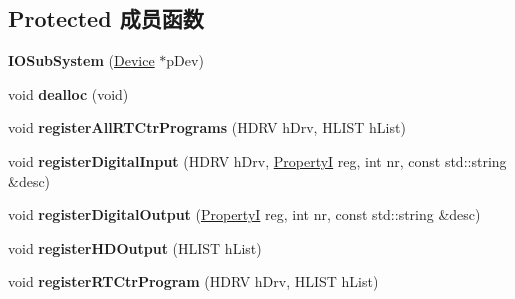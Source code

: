 \subsection*{Protected 成员函数}
\begin{DoxyCompactItemize}
\item 
\hypertarget{classmv_i_m_p_a_c_t_1_1acquire_1_1_i_o_sub_system_a5b11d134aa10c1e02d8e5cd57cd3cf91}{{\bfseries I\+O\+Sub\+System} (\hyperlink{classmv_i_m_p_a_c_t_1_1acquire_1_1_device}{Device} $\ast$p\+Dev)}\label{classmv_i_m_p_a_c_t_1_1acquire_1_1_i_o_sub_system_a5b11d134aa10c1e02d8e5cd57cd3cf91}

\item 
\hypertarget{classmv_i_m_p_a_c_t_1_1acquire_1_1_i_o_sub_system_af919596b5e34619bb71e0e09a4be8796}{void {\bfseries dealloc} (void)}\label{classmv_i_m_p_a_c_t_1_1acquire_1_1_i_o_sub_system_af919596b5e34619bb71e0e09a4be8796}

\item 
\hypertarget{classmv_i_m_p_a_c_t_1_1acquire_1_1_i_o_sub_system_a56ccb1aeb48f6d28b8276a3e0b8ddbd7}{void {\bfseries register\+All\+R\+T\+Ctr\+Programs} (H\+D\+R\+V h\+Drv, H\+L\+I\+S\+T h\+List)}\label{classmv_i_m_p_a_c_t_1_1acquire_1_1_i_o_sub_system_a56ccb1aeb48f6d28b8276a3e0b8ddbd7}

\item 
\hypertarget{classmv_i_m_p_a_c_t_1_1acquire_1_1_i_o_sub_system_a46b170c2210c1a4eef0fd8d68dce6722}{void {\bfseries register\+Digital\+Input} (H\+D\+R\+V h\+Drv, \hyperlink{group___common_interface_ga12d5e434238ca242a1ba4c6c3ea45780}{Property\+I} reg, int nr, const std\+::string \&desc)}\label{classmv_i_m_p_a_c_t_1_1acquire_1_1_i_o_sub_system_a46b170c2210c1a4eef0fd8d68dce6722}

\item 
\hypertarget{classmv_i_m_p_a_c_t_1_1acquire_1_1_i_o_sub_system_ae34699a099f9c243c1995cd18ee7799e}{void {\bfseries register\+Digital\+Output} (\hyperlink{group___common_interface_ga12d5e434238ca242a1ba4c6c3ea45780}{Property\+I} reg, int nr, const std\+::string \&desc)}\label{classmv_i_m_p_a_c_t_1_1acquire_1_1_i_o_sub_system_ae34699a099f9c243c1995cd18ee7799e}

\item 
\hypertarget{classmv_i_m_p_a_c_t_1_1acquire_1_1_i_o_sub_system_a953ec0eff5773459d42a13e98be87098}{void {\bfseries register\+H\+D\+Output} (H\+L\+I\+S\+T h\+List)}\label{classmv_i_m_p_a_c_t_1_1acquire_1_1_i_o_sub_system_a953ec0eff5773459d42a13e98be87098}

\item 
\hypertarget{classmv_i_m_p_a_c_t_1_1acquire_1_1_i_o_sub_system_a2fa885944f0282fffe4d0be7f7ff7757}{void {\bfseries register\+R\+T\+Ctr\+Program} (H\+D\+R\+V h\+Drv, H\+L\+I\+S\+T h\+List)}\label{classmv_i_m_p_a_c_t_1_1acquire_1_1_i_o_sub_system_a2fa885944f0282fffe4d0be7f7ff7757}


\end{DoxyCompactItemize}
